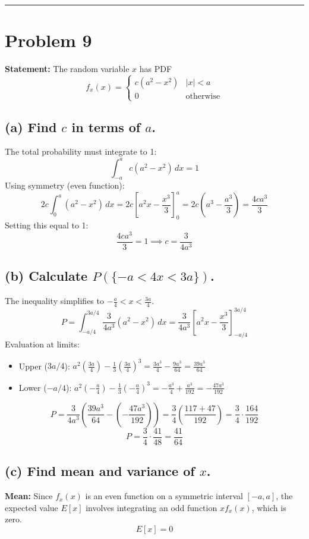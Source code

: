 \documentclass{article}
\begin{document}
\vspace{1cm}
\hrule
\vspace{1cm}

\section*{Problem 9}

\textbf{Statement:} The random variable $x$ has PDF
\[ f_x(x) = \begin{cases} c(a^2 - x^2) & |x| < a \\ 0 & \text{otherwise} \end{cases} \]

\subsection*{(a) Find $c$ in terms of $a$.}
The total probability must integrate to 1:
\[ \int_{-a}^{a} c(a^2 - x^2) \, dx = 1 \]
Using symmetry (even function):
\[ 2c \int_{0}^{a} (a^2 - x^2) \, dx = 2c \left[ a^2 x - \frac{x^3}{3} \right]_{0}^{a} = 2c \left( a^3 - \frac{a^3}{3} \right) = \frac{4c a^3}{3} \]
Setting this equal to 1:
\[ \frac{4c a^3}{3} = 1 \implies c = \frac{3}{4a^3} \]

\subsection*{(b) Calculate $P(\{-a < 4x < 3a\})$.}
The inequality simplifies to $-\frac{a}{4} < x < \frac{3a}{4}$.
\[ P = \int_{-a/4}^{3a/4} \frac{3}{4a^3} (a^2 - x^2) \, dx = \frac{3}{4a^3} \left[ a^2 x - \frac{x^3}{3} \right]_{-a/4}^{3a/4} \]
Evaluation at limits:
\begin{itemize}
	\item Upper ($3a/4$): $a^2(\frac{3a}{4}) - \frac{1}{3}(\frac{3a}{4})^3 = \frac{3a^3}{4} - \frac{9a^3}{64} = \frac{39a^3}{64}$
	\item Lower ($-a/4$): $a^2(-\frac{a}{4}) - \frac{1}{3}(-\frac{a}{4})^3 = -\frac{a^3}{4} + \frac{a^3}{192} =
		      -\frac{47a^3}{192}$
\end{itemize}
\[ P = \frac{3}{4a^3} \left( \frac{39a^3}{64} - \left( -\frac{47a^3}{192} \right) \right) = \frac{3}{4} \left( \frac{117 + 47}{192} \right) = \frac{3}{4} \cdot \frac{164}{192} \]
\[ P = \frac{3}{4} \cdot \frac{41}{48} = \frac{41}{64} \]

\subsection*{(c) Find mean and variance of $x$.}
\textbf{Mean:} Since $f_x(x)$ is an even function on a symmetric interval $[-a, a]$, the expected value $E[x]$ involves integrating an odd function $x f_x(x)$, which is zero.
\[ E[x] = 0 \]
\end{document}
